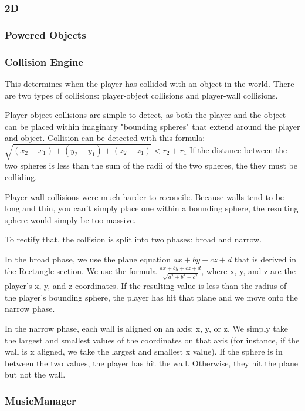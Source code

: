 \documentclass{article}
\begin{document}
\subsubsection{2D}

\subsubsection{Powered Objects}

\subsubsection{Collision Engine}
This determines when the player has collided with an object in the world. There are two types of collisions: player-object collisions and player-wall collisions.

Player object collisions are simple to detect, as both the player and the object can be placed within imaginary "bounding spheres" that extend around the player and object. Collision can be detected with this formula:
$\sqrt{(x_2 - x_1) + (y_2 - y_1) + (z_2 - z_1)} < r_2 + r_1$
If the distance between the two spheres is less than the sum of the radii of the two spheres, the they must be colliding.

Player-wall collisions were much harder to reconcile. Because walls tend to be long and thin, you can't simply place one within a bounding sphere, the resulting sphere would simply be too massive.

To rectify that, the collision is split into two phases: broad and narrow.

In the broad phase, we use the plane equation $ax + by + cz + d$ that is derived in the Rectangle section. We use the formula $\frac{ax + by + cz + d}{\sqrt{a^2 + b^2 + c^2}}$, where x, y, and z are the player's x, y, and z coordinates. If the resulting value is less than the radius of the player's bounding sphere, the player has hit that plane and we move onto the narrow phase.

In the narrow phase, each wall is aligned on an axis: x, y, or z. We simply take the largest and smallest values of the coordinates on that axis (for instance, if the wall is x aligned, we take the largest and smallest x value). If the sphere is in between the two values, the player has hit the wall. Otherwise, they hit the plane but not the wall.

\subsubsection{MusicManager}
\end{document}
